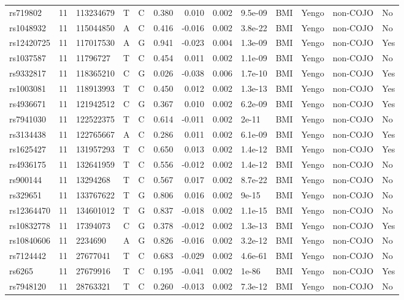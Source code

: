 \documentclass[11pt,twoside]{bristolthesis}
\begin{document}
\begin{longtable}[t]{lrlllrrrlllll}
rs719802 & 11 & 113234679 & T & C & 0.380 & 0.010 & 0.002 & 9.5e-09 & BMI & Yengo & non-COJO & No\\
rs1048932 & 11 & 115044850 & A & C & 0.416 & -0.016 & 0.002 & 3.8e-22 & BMI & Yengo & non-COJO & No\\
rs12420725 & 11 & 117017530 & A & G & 0.941 & -0.023 & 0.004 & 1.3e-09 & BMI & Yengo & non-COJO & Yes\\
rs1037587 & 11 & 11796727 & T & C & 0.454 & 0.011 & 0.002 & 1.1e-09 & BMI & Yengo & non-COJO & No\\
\addlinespace
rs9332817 & 11 & 118365210 & C & G & 0.026 & -0.038 & 0.006 & 1.7e-10 & BMI & Yengo & non-COJO & Yes\\
rs1003081 & 11 & 118913993 & T & C & 0.450 & 0.012 & 0.002 & 1.3e-13 & BMI & Yengo & non-COJO & Yes\\
rs4936671 & 11 & 121942512 & C & G & 0.367 & 0.010 & 0.002 & 6.2e-09 & BMI & Yengo & non-COJO & Yes\\
rs7941030 & 11 & 122522375 & T & C & 0.614 & -0.011 & 0.002 & 2e-11 & BMI & Yengo & non-COJO & No\\
rs3134438 & 11 & 122765667 & A & C & 0.286 & 0.011 & 0.002 & 6.1e-09 & BMI & Yengo & non-COJO & Yes\\
\addlinespace
rs1625427 & 11 & 131957293 & T & C & 0.650 & 0.013 & 0.002 & 1.4e-12 & BMI & Yengo & non-COJO & Yes\\
rs4936175 & 11 & 132641959 & T & C & 0.556 & -0.012 & 0.002 & 1.4e-12 & BMI & Yengo & non-COJO & No\\
rs900144 & 11 & 13294268 & T & C & 0.567 & 0.017 & 0.002 & 8.7e-22 & BMI & Yengo & non-COJO & No\\
rs329651 & 11 & 133767622 & T & G & 0.806 & 0.016 & 0.002 & 9e-15 & BMI & Yengo & non-COJO & No\\
rs12364470 & 11 & 134601012 & T & G & 0.837 & -0.018 & 0.002 & 1.1e-15 & BMI & Yengo & non-COJO & No\\
\addlinespace
rs10832778 & 11 & 17394073 & C & G & 0.378 & -0.012 & 0.002 & 1.3e-13 & BMI & Yengo & non-COJO & Yes\\
rs10840606 & 11 & 2234690 & A & G & 0.826 & -0.016 & 0.002 & 3.2e-12 & BMI & Yengo & non-COJO & No\\
rs7124442 & 11 & 27677041 & T & C & 0.683 & -0.029 & 0.002 & 4.6e-61 & BMI & Yengo & non-COJO & No\\
rs6265 & 11 & 27679916 & T & C & 0.195 & -0.041 & 0.002 & 1e-86 & BMI & Yengo & non-COJO & Yes\\
rs7948120 & 11 & 28763321 & T & C & 0.260 & -0.013 & 0.002 & 7.3e-12 & BMI & Yengo & non-COJO & No\\

\end{longtable}
\end{document}
